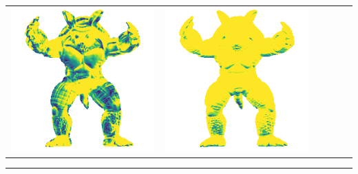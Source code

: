 \begin{tabularx}{\linewidth}{@{}Y@{}Y@{}Y@{}Y@{}Y@{}Y@{}}
\includegraphics[width=\linewidth]{semisynthetic/20160617_22_marrnet_err.png} &
\includegraphics[width=\linewidth]{semisynthetic/20160617_22_ef_err.png} \\
\end{tabularx}
\begin{center}\rule{0.5\linewidth}{\linethickness}\end{center}

